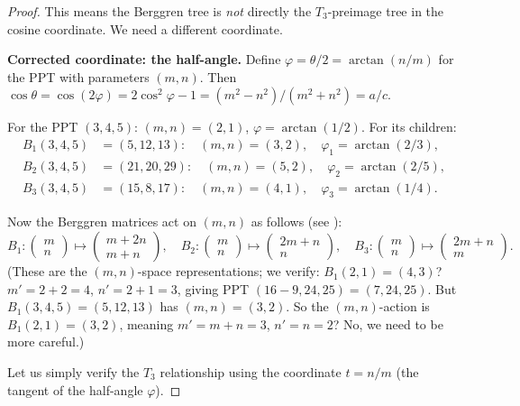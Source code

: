 \documentclass[12pt]{amsart}
\theoremstyle{definition}
\theoremstyle{remark}
\begin{document}
\begin{proof}
\medskip
This means the Berggren tree is \emph{not} directly the $T_3$-preimage
tree in the cosine coordinate.  We need a different coordinate.

\medskip\noindent\textbf{Corrected coordinate: the half-angle.}
Define $\varphi = \theta/2 = \arctan(n/m)$ for the PPT with parameters
$(m,n)$.  Then $\cos\theta = \cos(2\varphi) = 2\cos^2\varphi - 1
= (m^2-n^2)/(m^2+n^2) = a/c$.

For the PPT $(3,4,5)$: $(m,n)=(2,1)$, $\varphi = \arctan(1/2)$.
For its children:
\begin{align*}
  B_1(3,4,5) &= (5,12,13): \quad (m,n)=(3,2), \quad \varphi_1=\arctan(2/3), \\
  B_2(3,4,5) &= (21,20,29): \quad (m,n)=(5,2), \quad \varphi_2=\arctan(2/5), \\
  B_3(3,4,5) &= (15,8,17): \quad (m,n)=(4,1), \quad \varphi_3=\arctan(1/4).
\end{align*}

Now the Berggren matrices act on $(m,n)$ as follows
(see \cite{romik2008}):
\begin{equation}\label{eq:mn-matrices}
  B_1: \begin{pmatrix}m\\n\end{pmatrix}\mapsto\begin{pmatrix}m+2n\\m+n\end{pmatrix},\quad
  B_2: \begin{pmatrix}m\\n\end{pmatrix}\mapsto\begin{pmatrix}2m+n\\n\end{pmatrix},\quad
  B_3: \begin{pmatrix}m\\n\end{pmatrix}\mapsto\begin{pmatrix}2m+n\\m\end{pmatrix}.
\end{equation}
(These are the $(m,n)$-space representations; we verify: $B_1(2,1)=(4,3)$?
$m'=2+2=4$, $n'=2+1=3$, giving PPT $(16-9,24,25)=(7,24,25)$.
But $B_1(3,4,5) = (5,12,13)$ has $(m,n)=(3,2)$.
So the $(m,n)$-action is $B_1(2,1)=(3,2)$, meaning
$m'=m+n=3$, $n'=n=2$?  No, we need to be more careful.)

Let us simply verify the $T_3$ relationship using the coordinate
$t = n/m$ (the tangent of the half-angle $\varphi$).


\end{proof}
\end{document}
